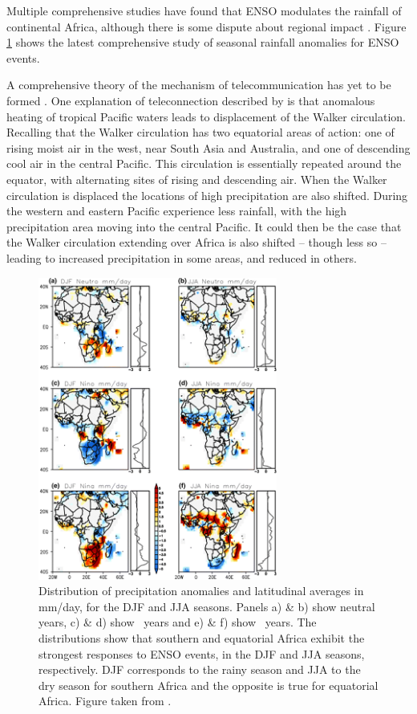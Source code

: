 Multiple comprehensive studies \citep{ropelewski1987, ropelewski1989,
  nicholson1996} have found that ENSO modulates the rainfall of continental
Africa, although there is some dispute about regional impact
\citep{wolter1989}. Figure \ref{fig:enso_rainfall_anoms} shows the latest
comprehensive study of seasonal rainfall anomalies for ENSO events.

A comprehensive theory of the mechanism of telecommunication has yet to be
formed \citep{philander1990}. One explanation of teleconnection described by
\cite{joly2009} is that anomalous heating of tropical Pacific waters leads to
displacement of the Walker circulation. Recalling that the Walker circulation
has two equatorial areas of action: one of rising moist air in the west, near
South Asia and Australia, and one of descending cool air in the central
Pacific. This circulation is essentially repeated around the equator, with
alternating sites of rising and descending air. When the Walker circulation is
displaced the locations of high precipitation are also shifted. During \elnino{}
the western and eastern Pacific experience less rainfall, with the high
precipitation area moving into the central Pacific. It could then be the case
that the Walker circulation extending over Africa is also shifted -- though less
so -- leading to increased precipitation in some areas, and reduced in others.

\begin{figure}
  \centering
  \includegraphics[width=0.7\textwidth]{figures/enso_africa_rainfall_anoms}
  \caption{Distribution of precipitation anomalies and latitudinal averages in
    mm/day, for the DJF and JJA seasons. Panels a) \& b) show neutral years, c)
    \& d) show \elnino\ years and e) \& f) show \nina\ years. The distributions
    show that southern and equatorial Africa exhibit the strongest responses to
    ENSO events, in the DJF and JJA seasons, respectively. DJF corresponds to the
    rainy season and JJA to the dry season for southern Africa and the opposite
    is true for equatorial Africa. Figure taken from \cite{deoliveira2018}.}
  \label{fig:enso_rainfall_anoms}
\end{figure}

